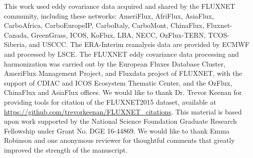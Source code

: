 \documentclass[draft]{agujournal2019}
\begin{document}
%
%
%
%
%
%
%
%


\acknowledgments This work used eddy covariance data acquired and
shared by the FLUXNET community, including these networks: AmeriFlux,
AfriFlux, AsiaFlux, CarboAfrica, CarboEuropeIP, CarboItaly, CarboMont,
ChinaFlux, Fluxnet-Canada, GreenGrass, ICOS, KoFlux, LBA, NECC,
OzFlux-TERN, TCOS-Siberia, and USCCC. The ERA-Interim reanalysis data
are provided by ECMWF and processed by LSCE. The FLUXNET eddy
covariance data processing and harmonization was carried out by the
European Fluxes Database Cluster, AmeriFlux Management Project, and
Fluxdata project of FLUXNET, with the support of CDIAC and ICOS
Ecosystem Thematic Center, and the OzFlux, ChinaFlux and AsiaFlux
offices. We would like to thank Dr. Trevor Keenan for providing tools
for citation of the FLUXNET2015 dataset, available at
\url{https://github.com/trevorkeenan/FLUXNET_citations}. This material
is based upon work supported by the National Science Foundation
Graduate Research Fellowship under Grant No. DGE 16-44869. We would
like to thank Emma Robinson and one anonymous reviewer for thoughtful
comments that greatly improved the strength of the manuscript.



%
%

% 
\end{document}
